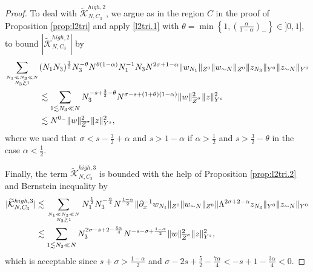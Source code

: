 \documentclass{amsart}
\theoremstyle{definition}
\theoremstyle{remark}
\numberwithin{equation}{section}
\begin{document}
\begin{proof}
To deal with $\widetilde{\mathcal{K}}_{N,C_3}^{high,2}$, we argue as in the region $C$ in the proof of Proposition \ref{prop:l2tri} and apply \eqref{l2tri.1} with $\theta=\min\left\{1, \left(\frac{\alpha}{1-\alpha}\right)_-\right\}\in ]0,1]$, to bound $|\widetilde{\mathcal{K}}_{N,C_3}^{high,2}|$ by
\begin{align*}
 \sum_{N_1\ll N_3 \ll N \atop N_3 \gtrsim 1}& (N_1N_3)^{\frac 12} N_3^{-\theta}N^{\theta(1-\alpha)} N_1^{-1}N_3 N^{2\sigma+1-\alpha} \|w_{N_1}\|_{Z^0} \|w_{\sim N}\|_{Z^0} \|z_{N_3}\|_{Y^0} \|z_{\sim N}\|_{Y^0}\\
  &\lesssim \sum_{1\lesssim N_3\ll N}  N_3^{-s + \frac 32-\theta} N^{\sigma-s+(1+\theta)(1-\alpha)} \|w\|_{\overline{Z}^\sigma}^2 \|z\|_{Y^s}^2\\
  &\lesssim N^{0_-} \|w\|_{\overline{Z}^\sigma}^2 \|z\|_{Y^s}^2 ,
\end{align*}
where we used that $\sigma<s-\frac32 +\alpha$ and $s>1-\alpha$ if $\alpha>\frac 12$ and $s>\frac 32-\theta$ in the case $\alpha< \frac 12$.

Finally, the term $\widetilde{\mathcal{K}}_{N,C_3}^{high,3}$ is bounded with the help of Proposition \ref{prop:l2tri.2} and Bernstein inequality by
\begin{align*}
  |\widetilde{\mathcal{K}}_{N,C_3}^{high,3}| &\lesssim \sum_{N_1\ll N_3\ll N\atop N_3\gtrsim 1} N_1^{\frac 12} N_3^{-\frac \alpha 4} N^{\frac{1-\alpha}2} \|\partial_x^{-1}w_{N_1}\|_{Z^0} \|w_{\sim N}\|_{Z^0} \|\Lambda^{2\sigma+2-\alpha}z_{N_3}\|_{Y^0} \|z_{\sim N}\|_{Y^0} \\
  &\lesssim \sum_{1\lesssim N_3\ll N} N_3^{2\sigma-s+2-\frac{5\alpha}4} N^{-s-\sigma+\frac{1-\alpha}2} \|w\|_{\overline{Z}^\sigma}^2 \|z\|_{Y^s}^2,
\end{align*}
which is acceptable since $s+\sigma > \frac{1-\alpha}2$ and $\sigma-2s+\frac 52-\frac{7\alpha}4 < -s+1-\frac{3\alpha}4<0$.


\end{proof}
\end{document}
